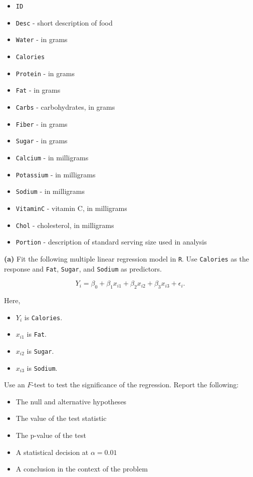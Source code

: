 \documentclass[
]{article}
\providecommand{\tightlist}{%
  \setlength{\itemsep}{0pt}\setlength{\parskip}{0pt}}
\begin{document}
\begin{itemize}
\tightlist
\item
  \texttt{ID}
\item
  \texttt{Desc} - short description of food
\item
  \texttt{Water} - in grams
\item
  \texttt{Calories}
\item
  \texttt{Protein} - in grams
\item
  \texttt{Fat} - in grams
\item
  \texttt{Carbs} - carbohydrates, in grams
\item
  \texttt{Fiber} - in grams
\item
  \texttt{Sugar} - in grams
\item
  \texttt{Calcium} - in milligrams
\item
  \texttt{Potassium} - in milligrams
\item
  \texttt{Sodium} - in milligrams
\item
  \texttt{VitaminC} - vitamin C, in milligrams
\item
  \texttt{Chol} - cholesterol, in milligrams
\item
  \texttt{Portion} - description of standard serving size used in
  analysis
\end{itemize}

\textbf{(a)} Fit the following multiple linear regression model in
\texttt{R}. Use \texttt{Calories} as the response and \texttt{Fat},
\texttt{Sugar}, and \texttt{Sodium} as predictors.

\[
Y_i = \beta_0 + \beta_1 x_{i1} + \beta_2 x_{i2} + \beta_3 x_{i3} + \epsilon_i.
\]

Here,

\begin{itemize}
\tightlist
\item
  \(Y_i\) is \texttt{Calories}.
\item
  \(x_{i1}\) is \texttt{Fat}.
\item
  \(x_{i2}\) is \texttt{Sugar}.
\item
  \(x_{i3}\) is \texttt{Sodium}.
\end{itemize}

Use an \(F\)-test to test the significance of the regression. Report the
following:

\begin{itemize}
\tightlist
\item
  The null and alternative hypotheses
\item
  The value of the test statistic
\item
  The p-value of the test
\item
  A statistical decision at \(\alpha = 0.01\)
\item
  A conclusion in the context of the problem
\end{itemize}
\end{document}
